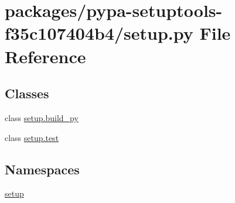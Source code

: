 \hypertarget{packages_2pypa-setuptools-f35c107404b4_2setup_8py}{}\section{packages/pypa-\/setuptools-\/f35c107404b4/setup.py File Reference}
\label{packages_2pypa-setuptools-f35c107404b4_2setup_8py}
\subsection*{Classes}
\begin{DoxyCompactItemize}
\item 
class \hyperlink{classsetup_1_1build__py}{setup.\+build\+\_\+py}
\item 
class \hyperlink{classsetup_1_1test}{setup.\+test}
\end{DoxyCompactItemize}
\subsection*{Namespaces}
\begin{DoxyCompactItemize}
\item 
 \hyperlink{namespacesetup}{setup}
\end{DoxyCompactItemize}
